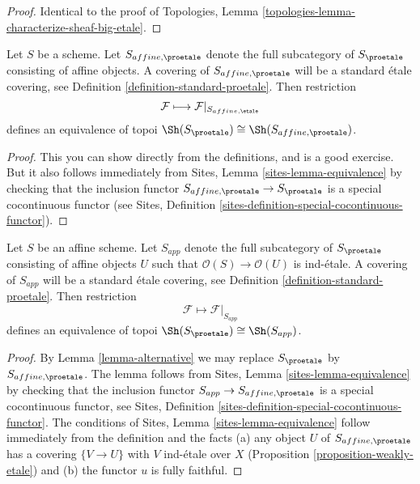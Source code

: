 \begin{proof}
Identical to the proof of
Topologies, Lemma \ref{topologies-lemma-characterize-sheaf-big-etale}.
\end{proof}

\begin{lemma}
\label{lemma-alternative}
Let $S$ be a scheme. Let $S_{affine, \proetale}$ denote the full subcategory
of $S_\proetale$ consisting of affine objects. A covering of
$S_{affine, \proetale}$ will be a standard \'etale covering, see
Definition \ref{definition-standard-proetale}.
Then restriction
$$
\mathcal{F} \longmapsto \mathcal{F}|_{S_{affine, \etale}}
$$
defines an equivalence of topoi
$\Sh(S_\proetale) \cong \Sh(S_{affine, \proetale})$.
\end{lemma}

\begin{proof}
This you can show directly from the definitions, and is a good exercise.
But it also follows immediately from
Sites, Lemma \ref{sites-lemma-equivalence}
by checking that the inclusion functor
$S_{affine, \proetale} \to S_\proetale$
is a special cocontinuous functor (see
Sites, Definition \ref{sites-definition-special-cocontinuous-functor}).
\end{proof}

\begin{lemma}
\label{lemma-affine-alternative}
Let $S$ be an affine scheme. Let $S_{app}$ denote the full subcategory
of $S_\proetale$ consisting of affine objects $U$ such that
$\mathcal{O}(S) \to \mathcal{O}(U)$ is ind-\'etale. A covering of
$S_{app}$ will be a standard \'etale covering, see
Definition \ref{definition-standard-proetale}.
Then restriction
$$
\mathcal{F} \longmapsto \mathcal{F}|_{S_{app}}
$$
defines an equivalence of topoi $\Sh(S_\proetale) \cong \Sh(S_{app})$.
\end{lemma}

\begin{proof}
By Lemma \ref{lemma-alternative} we may replace $S_\proetale$ by
$S_{affine, \proetale}$.
The lemma follows from Sites, Lemma \ref{sites-lemma-equivalence}
by checking that the inclusion functor $S_{app} \to S_{affine, \proetale}$
is a special cocontinuous functor, see
Sites, Definition \ref{sites-definition-special-cocontinuous-functor}.
The conditions of Sites, Lemma \ref{sites-lemma-equivalence}
follow immediately from the definition and the facts
(a) any object $U$ of $S_{affine, \proetale}$ has a covering
$\{V \to U\}$ with $V$ ind-\'etale over $X$
(Proposition \ref{proposition-weakly-etale})
and (b) the functor $u$ is fully faithful.
\end{proof}

